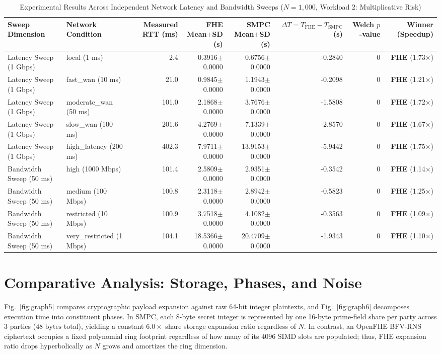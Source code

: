 \documentclass[conference]{IEEEtran}
\begin{document}
\begin{table}[htbp]
\caption{Experimental Results Across Independent Network Latency and Bandwidth Sweeps ($N=1,000$, Workload 2: Multiplicative Risk)}
\label{tab:network_sweeps}
\centering
\scriptsize
\begin{tabular}{@{}llrrrrrr@{}}
\toprule
\textbf{Sweep Dimension} & \textbf{Network Condition} & \textbf{Measured RTT (ms)} & \textbf{FHE Mean$\pm$SD (s)} & \textbf{SMPC Mean$\pm$SD (s)} & \textbf{$\Delta T = T_{\text{FHE}}-T_{\text{SMPC}}$ (s)} & \textbf{Welch $p$-value} & \textbf{Winner (Speedup)} \\
\midrule
Latency Sweep (1 Gbps) & local (1 ms) & 2.4 & 0.3916$\pm$0.0000 & 0.6756$\pm$0.0000 & -0.2840 & 0 & \textbf{FHE} (1.73$\times$) \\
Latency Sweep (1 Gbps) & fast\_wan (10 ms) & 21.0 & 0.9845$\pm$0.0000 & 1.1943$\pm$0.0000 & -0.2098 & 0 & \textbf{FHE} (1.21$\times$) \\
Latency Sweep (1 Gbps) & moderate\_wan (50 ms) & 101.0 & 2.1868$\pm$0.0000 & 3.7676$\pm$0.0000 & -1.5808 & 0 & \textbf{FHE} (1.72$\times$) \\
Latency Sweep (1 Gbps) & slow\_wan (100 ms) & 201.6 & 4.2769$\pm$0.0000 & 7.1339$\pm$0.0000 & -2.8570 & 0 & \textbf{FHE} (1.67$\times$) \\
Latency Sweep (1 Gbps) & high\_latency (200 ms) & 402.3 & 7.9711$\pm$0.0000 & 13.9153$\pm$0.0000 & -5.9442 & 0 & \textbf{FHE} (1.75$\times$) \\
Bandwidth Sweep (50 ms) & high (1000 Mbps) & 101.4 & 2.5809$\pm$0.0000 & 2.9351$\pm$0.0000 & -0.3542 & 0 & \textbf{FHE} (1.14$\times$) \\
Bandwidth Sweep (50 ms) & medium (100 Mbps) & 100.8 & 2.3118$\pm$0.0000 & 2.8942$\pm$0.0000 & -0.5823 & 0 & \textbf{FHE} (1.25$\times$) \\
Bandwidth Sweep (50 ms) & restricted (10 Mbps) & 100.9 & 3.7518$\pm$0.0000 & 4.1082$\pm$0.0000 & -0.3563 & 0 & \textbf{FHE} (1.09$\times$) \\
Bandwidth Sweep (50 ms) & very\_restricted (1 Mbps) & 104.1 & 18.5366$\pm$0.0000 & 20.4709$\pm$0.0000 & -1.9343 & 0 & \textbf{FHE} (1.10$\times$) \\
\bottomrule
\end{tabular}
\end{table}

\section{Comparative Analysis: Storage, Phases, and Noise}
Fig.~\ref{fig:graph5} compares cryptographic payload expansion against raw 64-bit integer plaintexts, and Fig.~\ref{fig:graph6} decomposes execution time into constituent phases. In SMPC, each 8-byte secret integer is represented by one 16-byte prime-field share per party across 3 parties ($48\text{ bytes}$ total), yielding a constant $6.0\times$ share storage expansion ratio regardless of $N$. In contrast, an OpenFHE BFV-RNS ciphertext occupies a fixed polynomial ring footprint regardless of how many of its $4096$ SIMD slots are populated; thus, FHE expansion ratio drops hyperbolically as $N$ grows and amortizes the ring dimension.
\end{document}
